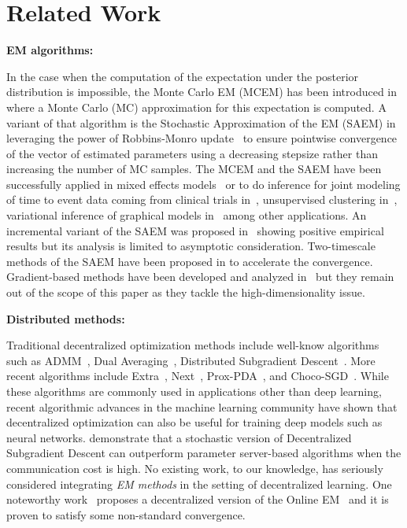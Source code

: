 \documentclass[11pt]{article}
\theoremstyle{t}
\begin{document}
\clearpage
\section{Related Work}

\textbf{EM algorithms:}

In the case when the computation of the expectation under the posterior distribution is impossible, the Monte Carlo EM (MCEM) has been introduced in~\cite{wei1990monte} where a Monte Carlo (MC) approximation for this expectation is computed. A variant of that algorithm is the Stochastic Approximation of the EM (SAEM) in~\cite{delyon1999} leveraging the power of Robbins-Monro update~\cite{robbins1951stochastic} to ensure pointwise convergence of the vector of estimated parameters using a decreasing stepsize rather than increasing the number of MC samples.
The MCEM and the SAEM have been successfully applied in mixed effects models~\cite{mcculloch1997maximum,hughes1999mixed,baey2016nonlinear} or to do inference for joint modeling of time to event data coming from clinical trials in~\cite{das2010Inferences}, unsupervised clustering in~\cite{ngChoice2003}, variational inference of graphical models in~\cite{BleiVariational2017} among other applications.
An incremental variant of the SAEM was proposed in~\cite{kuhn2019properties} showing positive empirical results but its analysis is limited to asymptotic consideration. 
Two-timescale methods of the SAEM have been proposed in \citep{karimi2020two} to accelerate the convergence.
Gradient-based methods have been developed and analyzed in~\cite{zhu2017high} but they remain out of the scope of this paper as they tackle the high-dimensionality issue.



\textbf{Distributed methods:}

\citep{morral2012line}
\citep{srivastava2019asynchronous}


Traditional decentralized optimization methods include well-know algorithms such as ADMM~\citep{boyd2011distributed}, Dual Averaging~\citep{duchi2011dual}, Distributed Subgradient Descent~\citep{nedic2009distributed}. 
More recent algorithms include Extra~\citep{shi2015extra}, Next~\citep{di2016next}, Prox-PDA~\citep{hong2017prox}, and Choco-SGD~\citep{koloskova2019decentralized}.  
While these algorithms are commonly used in applications other than deep learning, recent algorithmic advances in the machine learning community have shown that decentralized optimization can also be useful for training deep models such as neural networks. 
\citet{lian2017can} demonstrate that a stochastic version of Decentralized Subgradient Descent can outperform parameter server-based algorithms when the communication cost is high. 
No existing work, to our knowledge, has seriously considered integrating \emph{EM methods} in the setting of decentralized learning.
One noteworthy work~\citep{morral2012line} proposes a decentralized version of the Online EM~\citep{cappe2009line} and it is proven to satisfy some non-standard convergence.
\end{document}
